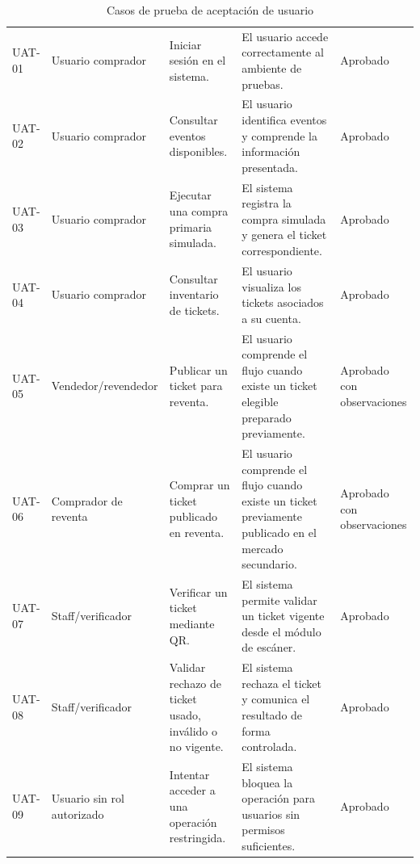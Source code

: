 \documentclass[12pt,letterpaper]{article}
\begin{document}
\begin{table}[H]
\centering
\begingroup
\scriptsize
\setlength{\tabcolsep}{2.5pt}
\renewcommand{\arraystretch}{1.18}

\begin{tabularx}{\textwidth}{|
>{\raggedright\arraybackslash}p{2.3cm}|
>{\raggedright\arraybackslash}p{3.0cm}|
>{\raggedright\arraybackslash}X|
>{\raggedright\arraybackslash}p{3.7cm}|
>{\centering\arraybackslash}p{1.5cm}|}
\hline
\multicolumn{1}{|>{\centering\arraybackslash}m{2.3cm}|}{\textbf{ID}} &
\multicolumn{1}{>{\centering\arraybackslash}m{3.0cm}|}{\textbf{Perfil}} &
\multicolumn{1}{>{\centering\arraybackslash}m{3.8cm}|}{\textbf{Tarea}} &
\multicolumn{1}{>{\centering\arraybackslash}m{3.7cm}|}{\textbf{Resultado esperado}} &
\multicolumn{1}{>{\centering\arraybackslash}m{1.5cm}|}{\textbf{Estado}} \\
\hline
UAT-01 & Usuario comprador & Iniciar sesión en el sistema. & El usuario accede correctamente al ambiente de pruebas. & Aprobado \\
\hline
UAT-02 & Usuario comprador & Consultar eventos disponibles. & El usuario identifica eventos y comprende la información presentada. & Aprobado \\
\hline
UAT-03 & Usuario comprador & Ejecutar una compra primaria simulada. & El sistema registra la compra simulada y genera el ticket correspondiente. & Aprobado \\
\hline
UAT-04 & Usuario comprador & Consultar inventario de tickets. & El usuario visualiza los tickets asociados a su cuenta. & Aprobado \\
\hline
UAT-05 & Vendedor/revendedor & Publicar un ticket para reventa. & El usuario comprende el flujo cuando existe un ticket elegible preparado previamente. & Aprobado con observaciones \\
\hline
UAT-06 & Comprador de reventa & Comprar un ticket publicado en reventa. & El usuario comprende el flujo cuando existe un ticket previamente publicado en el mercado secundario. & Aprobado con observaciones \\
\hline
UAT-07 & Staff/verificador & Verificar un ticket mediante QR. & El sistema permite validar un ticket vigente desde el módulo de escáner. & Aprobado \\
\hline
UAT-08 & Staff/verificador & Validar rechazo de ticket usado, inválido o no vigente. & El sistema rechaza el ticket y comunica el resultado de forma controlada. & Aprobado \\
\hline
UAT-09 & Usuario sin rol autorizado & Intentar acceder a una operación restringida. & El sistema bloquea la operación para usuarios sin permisos suficientes. & Aprobado \\
\hline
\end{tabularx}

\endgroup
\caption{Casos de prueba de aceptación de usuario}
\label{tab:casos-prueba-aceptacion}
\end{table}
\end{document}
